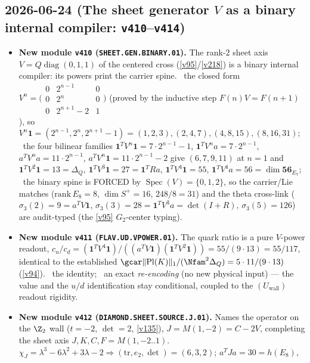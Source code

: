 \subsection*{2026-06-24 (The sheet generator $V$ as a binary internal compiler: \texttt{v410}--\texttt{v414})}
\begin{itemize}
\item \textbf{New module \texttt{v410} (\texttt{SHEET.GEN.BINARY.01}).} The rank-$2$ sheet axis
$V=Q\operatorname{diag}(0,1,1)$ of the centered cross (\vref{v95}/\vref{v218}) is a binary internal compiler:
its powers print the carrier spine. \mE\ the closed form $V^n=\big(\begin{smallmatrix}0&2^{n-1}&0\\0&2^n&0\\0&2^{n+1}-2&1\end{smallmatrix}\big)$
(proved by the inductive step $F(n)V{=}F(n{+}1)$), so $V^n\mathbf 1=(2^{n-1},2^n,2^{n+1}-1)=(1,2,3),(2,4,7),(4,8,15),(8,16,31)$;
\mE\ the four bilinear families $\mathbf 1^TV^n\mathbf 1=7\cdot2^{n-1}{-}1$, $\mathbf 1^TV^na=7\cdot2^{n-1}$,
$a^TV^na=11\cdot2^{n-1}$, $a^TV^n\mathbf 1=11\cdot2^{n-1}{-}2$ give $(6,7,9,11)$ at $n{=}1$ and
$\mathbf 1^TV^2\mathbf 1{=}13{=}\Delta_Q$, $\mathbf 1^TV^3\mathbf 1{=}27{=}\mathbf 1^TRa$,
$\mathbf 1^TV^4\mathbf 1{=}55$, $\mathbf 1^TV^4a{=}56{=}\dim\mathbf{56}_{E_7}$; \mC\ the binary spine is FORCED by
$\operatorname{Spec}(V){=}\{0,1,2\}$, so the carrier/Lie matches ($\mathrm{rank}\,E_8{=}8$, $\dim S^+{=}16$,
$248/8{=}31$) and the theta cross-link ($\sigma_3(2){=}9{=}a^TV\mathbf 1$, $\sigma_3(3){=}28{=}\mathbf 1^TV^3a{=}\det(I{+}R)$,
$\sigma_3(5){=}126$) are audit-typed (the \vref{v95} $G_2$-center typing).
\item \textbf{New module \texttt{v411} (\texttt{FLAV.UD.VPOWER.01}).} The quark ratio is a pure $V$-power readout,
$c_u/c_d=(\mathbf 1^TV^4\mathbf 1)/((a^TV\mathbf 1)(\mathbf 1^TV^2\mathbf 1))=55/(9\cdot13)=55/117$, identical to the
established $\gcar\|\mathrm{Pl}(K)\|_1/(\Nfam^2\Delta_Q)=5\cdot11/(9\cdot13)$ (\vref{v94}). \mE\ the identity; \mC\ an
exact \emph{re-encoding} (no new physical input) --- the value and the $u/d$ identification stay conditional, coupled
to the $(U_{\mathrm{wall}})$ readout rigidity.
\item \textbf{New module \texttt{v412} (\texttt{DIAMOND.SHEET.SOURCE.J.01}).} Names the operator on the $\Z_2$ wall
($t{=}{-}2$, $\det{=}2$, \vref{v135}), $J{=}M(1,{-}2){=}C{-}2V$, completing the sheet axis $J,K,C,F{=}M(1,{-}2..1)$.
\mE\ $\chi_J=\lambda^3-6\lambda^2+3\lambda-2\Rightarrow(\mathrm{tr},e_2,\det){=}(6,3,2)$; $a^TJa{=}30{=}h(E_8)$,

\end{itemize}
